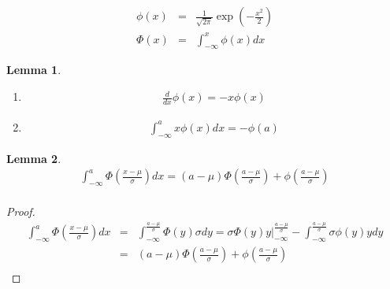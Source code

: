 \documentclass{article}
\newtheorem{lemma}{Lemma}
\begin{document}
\begin{eqnarray*}
  \phi(x) & = & \frac{1}{\sqrt{2\pi}}\exp\left(-\frac{x^2}{2}\right)\\
  \Phi(x) & = & \int_{-\infty}^x \phi(x) d\!x
\end{eqnarray*}

\begin{lemma}
  \begin{enumerate}
    \item
      \begin{eqnarray*}
        \frac{d}{d\!x}\phi(x) = -x \phi(x)
      \end{eqnarray*}
    \item
      \begin{eqnarray*}
        \int_{-\infty}^a x\phi(x)d\!x = -\phi(a)
      \end{eqnarray*}
  \end{enumerate}
\end{lemma}

\begin{lemma}
  \begin{eqnarray*}
    \int_{-\infty}^a \Phi\left(\frac{x - \mu}{\sigma}\right) d\!x = \left(a - \mu\right) \Phi\left(\frac{a-\mu}{\sigma}\right) + \phi\left(\frac{a-\mu}{\sigma}\right)\\
  \end{eqnarray*}
\end{lemma}
\begin{proof}
  \begin{eqnarray*}
    \int_{-\infty}^a \Phi\left(\frac{x - \mu}{\sigma}\right) d\!x & = & \int_{-\infty}^{\frac{a-\mu}{\sigma}} \Phi(y) \sigma d\!y = \left.\sigma \Phi(y) y\right\vert_{-\infty}^{\frac{a-\mu}{\sigma}} - \int_{-\infty}^{\frac{a-\mu}{\sigma}} \sigma\phi(y) y d\!y\\
    & = & \left(a - \mu\right) \Phi\left(\frac{a-\mu}{\sigma}\right) + \phi\left(\frac{a-\mu}{\sigma}\right)\\
  \end{eqnarray*}
\end{proof}
\end{document}
